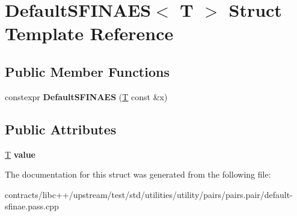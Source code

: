 \hypertarget{struct_default_s_f_i_n_a_e_s}{}\section{Default\+S\+F\+I\+N\+A\+ES$<$ T $>$ Struct Template Reference}
\label{struct_default_s_f_i_n_a_e_s}
\subsection*{Public Member Functions}
\begin{DoxyCompactItemize}
\item 
\mbox{\label{struct_default_s_f_i_n_a_e_s_a5ed5e401232b502e7a2838ac89424c32}} 
constexpr {\bfseries Default\+S\+F\+I\+N\+A\+ES} (\mbox{\hyperlink{struct_t}{T}} const \&x)
\end{DoxyCompactItemize}
\subsection*{Public Attributes}
\begin{DoxyCompactItemize}
\item 
\mbox{\label{struct_default_s_f_i_n_a_e_s_a831d5f119a94a1d44f489ef731544951}} 
\mbox{\hyperlink{struct_t}{T}} {\bfseries value}
\end{DoxyCompactItemize}


The documentation for this struct was generated from the following file\+:\begin{DoxyCompactItemize}
\item 
contracts/libc++/upstream/test/std/utilities/utility/pairs/pairs.\+pair/default-\/sfinae.\+pass.\+cpp\end{DoxyCompactItemize}

